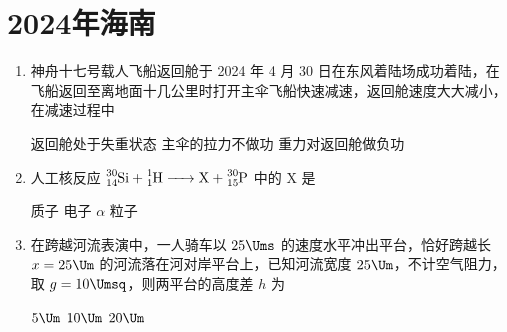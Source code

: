 \documentclass[\gkver]{gaokaozhenti}
\begin{document}
\chapter{2024年海南}

\begin{enumerate}
\item
神舟十七号载人飞船返回舱于 2024 年 4 月 30 日在东风着陆场成功着陆，在飞船返回至离地面十几公里时打开主伞飞船快速减速，返回舱速度大大减小，在减速过程中

{返回舱处于失重状态}
{主伞的拉力不做功}
{重力对返回舱做负功}


\item
人工核反应 $\ce{^{30}_{14}Si + ^{1}_{1}H -> X + ^{30}_{15}P}$ 中的 X 是

{质子}
{电子}
{$\alpha$ 粒子}


\item
在跨越河流表演中，一人骑车以 $25 \Ums$ 的速度水平冲出平台，恰好跨越长 $x = 25 \Um$ 的河流落在河对岸平台上，已知河流宽度 $25 \Um$，不计空气阻力，取 $g = 10 \Umsq$，则两平台的高度差 $h$ 为


\fourchoices[answer=B]
{$0.5 \Um$}
{$5 \Um$}
{$10 \Um$}
{$20 \Um$}


\end{enumerate}
\end{document}

